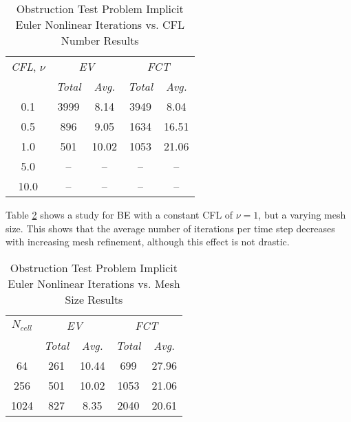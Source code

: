 \begin{table}[htb]\caption{Obstruction Test Problem Implicit Euler
  Nonlinear Iterations vs. CFL Number Results}
\label{tab:obstruction_be_iterations_cfl}
\centering
\begin{tabular}{c c c c c}\toprule
\emph{CFL}, $\nu$ & \multicolumn{2}{c}{\emph{EV}} & \multicolumn{2}{c}{\emph{FCT}}\\
                  & \emph{Total} & \emph{Avg.} &  \emph{Total} & \emph{Avg.}\\\midrule
0.1 & 3999 &  8.14 & 3949 & 8.04\\
0.5 & 896  &  9.05 & 1634 & 16.51\\
1.0 & 501  & 10.02 & 1053 & 21.06\\
5.0 & --   & --    & --   & --\\
10.0 & --   & --    & --   & --\\
\bottomrule\end{tabular}
\end{table}

Table \ref{tab:obstruction_be_iterations_mesh} shows a study for BE with a
constant CFL of $\nu=1$, but a varying mesh size. This shows that the average
number of iterations per time step decreases with increasing mesh refinement,
although this effect is not drastic.

\begin{table}[htb]\caption{Obstruction Test Problem Implicit Euler
  Nonlinear Iterations vs. Mesh Size Results}
\label{tab:obstruction_be_iterations_mesh}
\centering
\begin{tabular}{c c c c c}\toprule
$N_{cell}$ & \multicolumn{2}{c}{\emph{EV}} & \multicolumn{2}{c}{\emph{FCT}}\\
           & \emph{Total} & \emph{Avg.} &  \emph{Total} & \emph{Avg.}\\\midrule
64         & 261 & 10.44 &  699 & 27.96\\
256        & 501 & 10.02 & 1053 & 21.06\\
1024       & 827 &  8.35 & 2040 & 20.61\\
\bottomrule\end{tabular}
\end{table}

